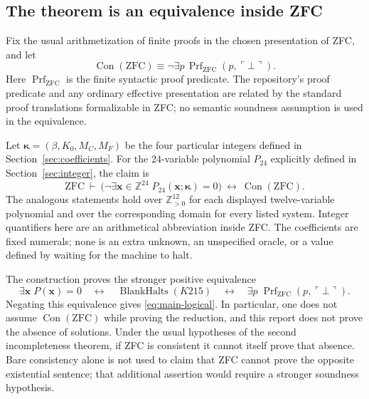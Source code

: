 \documentclass[11pt,letterpaper]{article}
\newcommand{\Z}{\mathbb Z}
\theoremstyle{remark}
\begin{document}
\subsection{The theorem is an equivalence inside ZFC}

Fix the usual arithmetization of finite proofs in the chosen presentation
of ZFC, and let
\[
 \operatorname{Con}(\mathrm{ZFC})\equiv
 \neg\exists p\,\operatorname{Prf}_{\mathrm{ZFC}}
                         (p,\ulcorner\bot\urcorner).
\]
Here $\operatorname{Prf}_{\mathrm{ZFC}}$ is the finite syntactic proof
predicate.  The repository's proof predicate and any ordinary effective
presentation are related by the standard proof translations formalizable
in ZFC; no semantic soundness assumption is used in the equivalence.

Let $\boldsymbol\kappa=(\beta,K_0,M_C,M_F)$ be the four particular
integers defined in Section~\ref{sec:coefficients}.  For the 24-variable
polynomial $P_{24}$ explicitly defined in Section~\ref{sec:integer},
the claim is
\begin{equation}\label{eq:main-logical}
 \boxed{\quad\mathrm{ZFC}\ \vdash\
 \bigl(\neg\exists\boldsymbol x\in\Z^{24}\;
       P_{24}(\boldsymbol x;\boldsymbol\kappa)=0\bigr)
 \ \longleftrightarrow\ \operatorname{Con}(\mathrm{ZFC}).\quad}
\end{equation}
The analogous statements hold over $\Z_{>0}^{12}$ for each displayed
twelve-variable polynomial and over the corresponding domain for every
listed system.  Integer quantifiers here are an arithmetical abbreviation
inside ZFC.  The coefficients are fixed numerals; none is an extra
unknown, an unspecified oracle, or a value defined by waiting for the
machine to halt.

The construction proves the stronger positive equivalence
\begin{equation}\label{eq:existential-chain}
 \exists\boldsymbol x\;P(\boldsymbol x)=0
 \quad\longleftrightarrow\quad
 \operatorname{BlankHalts}(K215)
 \quad\longleftrightarrow\quad
 \exists p\;\operatorname{Prf}_{\mathrm{ZFC}}(p,\ulcorner\bot\urcorner).
\end{equation}
Negating this equivalence gives \eqref{eq:main-logical}.  In particular,
one does not assume $\operatorname{Con}(\mathrm{ZFC})$ while proving the
reduction, and this report does not prove the absence of solutions.
Under the usual hypotheses of the second incompleteness theorem, if ZFC
is consistent it cannot itself prove that absence.  Bare consistency
alone is not used to claim that ZFC cannot prove the opposite existential
sentence; that additional assertion would require a stronger soundness
hypothesis.
\end{document}
